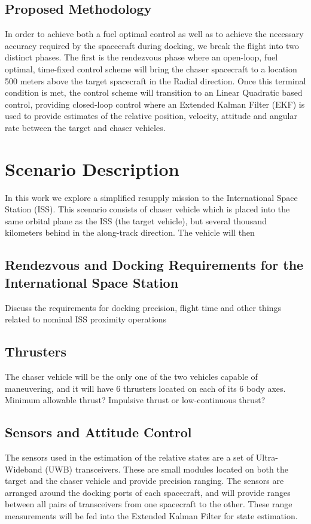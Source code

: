 \documentclass[conf]{new-aiaa}
\begin{document}
\subsection{Proposed Methodology}
In order to achieve both a fuel optimal control as well as to achieve the necessary accuracy required by the spacecraft during docking, we break the flight into two distinct phases.  The first is the rendezvous phase where an open-loop, fuel optimal, time-fixed control scheme will bring the chaser spacecraft to a location 500 meters above the target spacecraft in the Radial direction.  Once this terminal condition is met, the control scheme will transition to an Linear Quadratic based control, providing closed-loop control where an Extended Kalman Filter (EKF) is used to provide estimates of the relative position, velocity, attitude and angular rate between the target and chaser vehicles.


\section{Scenario Description}
In this work we explore a simplified resupply mission to the International Space Station (ISS).  This scenario consists of chaser vehicle which is placed into the same orbital plane as the ISS (the target vehicle), but several thousand kilometers behind in the along-track direction.  The vehicle will then

\subsection{Rendezvous and Docking Requirements for the International Space Station}
{\color{red}Discuss the requirements for docking precision, flight time and other things related to nominal ISS proximity operations}\cite{iss}

\subsection{Thrusters}
The chaser vehicle will be the only one of the two vehicles capable of maneuvering, and it will have 6 thrusters located on each of its 6 body axes.  {\color{red} Minimum allowable thrust?  Impulsive thrust or low-continuous thrust?}

\subsection{Sensors and Attitude Control}
The sensors used in the estimation of the relative states are a set of Ultra-Wideband (UWB) transceivers.  These are small modules located on both the target and the chaser vehicle and provide precision ranging.  The sensors are arranged around the docking ports of each spacecraft, and will provide ranges between all pairs of transceivers from one spacecraft to the other.  These range measurements will be fed into the Extended Kalman Filter for state estimation.
\end{document}
